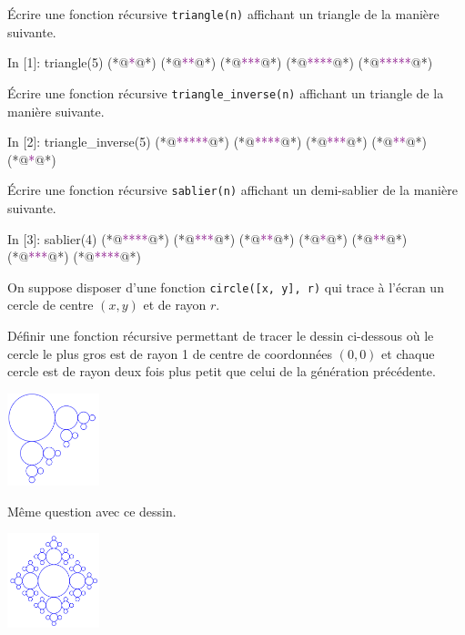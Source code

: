 \documentclass{magnolia}
\begin{document}
\begin{questions}
\question Écrire une fonction récursive \verb!triangle(n)! affichant un triangle de la manière
  suivante.
\begin{pythoncode}
In [1]: triangle(5)
(*@\textcolor{purple}{*}@*)
(*@\textcolor{purple}{**}@*)
(*@\textcolor{purple}{***}@*)
(*@\textcolor{purple}{****}@*)
(*@\textcolor{purple}{*****}@*)
\end{pythoncode}
\question Écrire une fonction récursive \verb!triangle_inverse(n)! affichant un triangle de la manière
  suivante.
\begin{pythoncode}
In [2]: triangle_inverse(5)
(*@\textcolor{purple}{*****}@*)
(*@\textcolor{purple}{****}@*)
(*@\textcolor{purple}{***}@*)
(*@\textcolor{purple}{**}@*)
(*@\textcolor{purple}{*}@*)
\end{pythoncode}
\question Écrire une fonction récursive \verb!sablier(n)! affichant un demi-sablier de la manière
  suivante.
\begin{pythoncode}
In [3]: sablier(4)
(*@\textcolor{purple}{****}@*)
(*@\textcolor{purple}{***}@*)
(*@\textcolor{purple}{**}@*)
(*@\textcolor{purple}{*}@*)
(*@\textcolor{purple}{**}@*)
(*@\textcolor{purple}{***}@*)
(*@\textcolor{purple}{****}@*)
\end{pythoncode}
\end{questions}

On suppose disposer d'une fonction \verb!circle([x, y], r)! qui trace à l'écran un cercle de
centre $(x,y)$ et de rayon $r$.
\begin{questions}
\question Définir une fonction récursive permettant de tracer le dessin ci-dessous où le
  cercle le plus gros est de rayon 1 de centre de coordonnées $(0,0)$ et chaque cercle est
	de rayon deux fois plus petit que celui de la génération précédente.
\begin{center}
\includegraphics[width=0.2\textwidth]{../../Commun/Images/python-exos-rec-3.pdf}
\end{center}
\question Même question avec ce dessin.
\begin{center}
\includegraphics[width=0.2\textwidth]{../../Commun/Images/python-exos-rec-4.pdf}
\end{center}
\end{questions}
\end{document}
